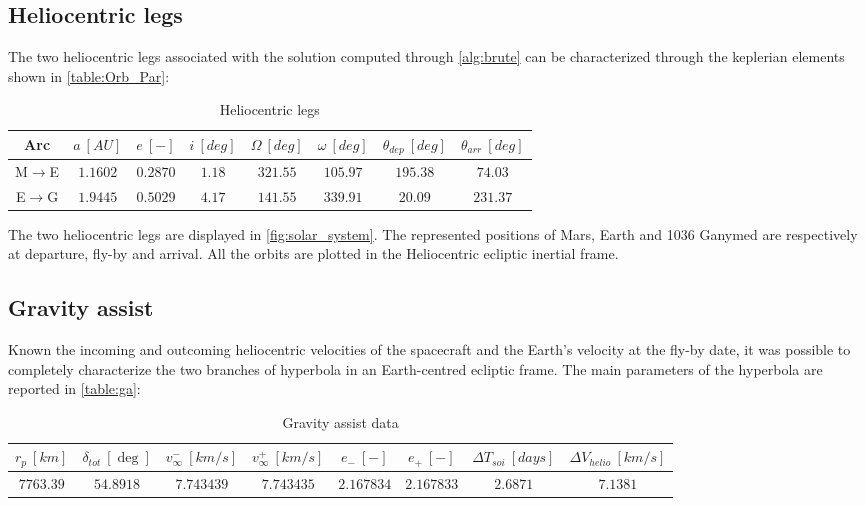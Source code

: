 \subsection{Heliocentric legs}
\label{subsec:heliocentric}
The two heliocentric legs associated with the solution computed through \autoref{alg:brute} can be characterized through the keplerian elements shown in \autoref{table:Orb_Par}:
\begin{table}[H]

    \centering
    \begin{tabular}{|c|c|c|c|c|c|c|c|}
    \hline
    Arc &  $a  \ [AU]$ & $e \ [-]$ & $i \ [deg]$ & $\Omega \ [deg]$ & $\omega \ [deg]$ & $\theta_{dep} \ [deg]$ & $\theta_{arr} \ [deg]$ \\
    \hline
    M$\to$E &  $1.1602$ & $0.2870$ & $1.18$ & $321.55$ & $105.97$ & $195.38$ & $74.03$ \\
    \hline
    E$\to$G & $1.9445$ & $0.5029$ & $4.17$ & $141.55$ & $339.91$ & $20.09$ & $231.37$ \\
    \hline
    \end{tabular}
    
    \caption{Heliocentric legs}
    \label{table:Orb_Par}
\end{table}

The two heliocentric legs are displayed in \autoref{fig:solar_system}. The represented positions of Mars, Earth and 1036 Ganymed are respectively at departure, fly-by and arrival. All the orbits are plotted in the Heliocentric ecliptic inertial frame.
\subsection{Gravity assist}
\label{subsec:ga}

Known the incoming and outcoming heliocentric velocities of the spacecraft and the Earth's velocity at the fly-by date, it was possible to completely characterize the two branches of hyperbola in an Earth-centred ecliptic frame. The main parameters of the hyperbola are reported in \autoref{table:ga}:

\begin{table}[H]

    \centering
    \begin{tabular}{|c|c|c|c|c|c|c|c|}
    \hline
    $r_p \ [km]$ &  $\delta _{tot} \ [\deg]$ & $v_{\infty}^{-} \ [km/s]$ & $v_{\infty}^{+} \ [km/s]$ & $e_{-} \ [-]$ & $e_{+} \ [-]$ & $\Delta T_{soi} \ [days]$ & $\Delta V_{helio} \ [km/s]$ \\
    \hline
    $7763.39$ &  $54.8918$ & $7.743439$ & $7.743435$ & $2.167834$ & $2.167833$ & $2.6871$ & $7.1381$ \\
    \hline
    \end{tabular}
    
    \caption{Gravity assist data}
    \label{table:ga} 
\end{table}

